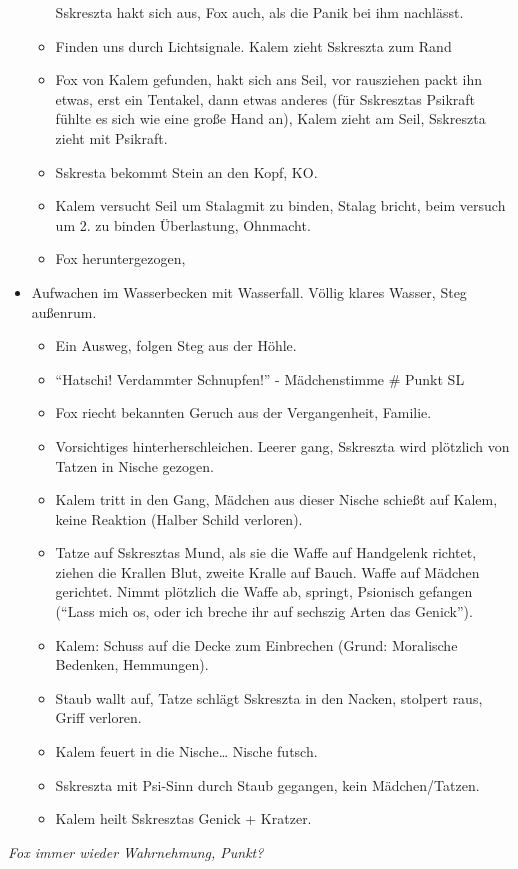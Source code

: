 \documentclass[11pt]{article}
\begin{document}
\begin{itemize}
\begin{itemize}
    Sskreszta hakt sich aus, Fox auch, als die Panik bei ihm nachlässt.
  \item
    Finden uns durch Lichtsignale. Kalem zieht Sskreszta zum Rand
  \item
    Fox von Kalem gefunden, hakt sich ans Seil, vor rausziehen packt ihn
    etwas, erst ein Tentakel, dann etwas anderes (für Sskresztas
    Psikraft fühlte es sich wie eine große Hand an), Kalem zieht am
    Seil, Sskreszta zieht mit Psikraft.
  \item
    Sskresta bekommt Stein an den Kopf, KO.
  \item
    Kalem versucht Seil um Stalagmit zu binden, Stalag bricht, beim
    versuch um 2. zu binden Überlastung, Ohnmacht.
  \item
    Fox heruntergezogen,
  \end{itemize}
\item
  Aufwachen im Wasserbecken mit Wasserfall. Völlig klares Wasser, Steg
  außenrum.

  \begin{itemize}
  \item
    Ein Ausweg, folgen Steg aus der Höhle.
  \item
    ``Hatschi! Verdammter Schnupfen!'' - Mädchenstimme \# Punkt SL
  \item
    Fox riecht bekannten Geruch aus der Vergangenheit, Familie.
  \item
    Vorsichtiges hinterherschleichen. Leerer gang, Sskreszta wird
    plötzlich von Tatzen in Nische gezogen.
  \item
    Kalem tritt in den Gang, Mädchen aus dieser Nische schießt auf
    Kalem, keine Reaktion (Halber Schild verloren).
  \item
    Tatze auf Sskresztas Mund, als sie die Waffe auf Handgelenk richtet,
    ziehen die Krallen Blut, zweite Kralle auf Bauch. Waffe auf Mädchen
    gerichtet. Nimmt plötzlich die Waffe ab, springt, Psionisch gefangen
    (``Lass mich os, oder ich breche ihr auf sechszig Arten das
    Genick'').
  \item
    Kalem: Schuss auf die Decke zum Einbrechen (Grund: Moralische
    Bedenken, Hemmungen).
  \item
    Staub wallt auf, Tatze schlägt Sskreszta in den Nacken, stolpert
    raus, Griff verloren.
  \item
    Kalem feuert in die Nische\ldots{} Nische futsch.
  \item
    Sskreszta mit Psi-Sinn durch Staub gegangen, kein Mädchen/Tatzen.
  \item
    Kalem heilt Sskresztas Genick + Kratzer.
  \end{itemize}
\end{itemize}
\emph{Fox immer wieder Wahrnehmung, Punkt?}
\end{document}
